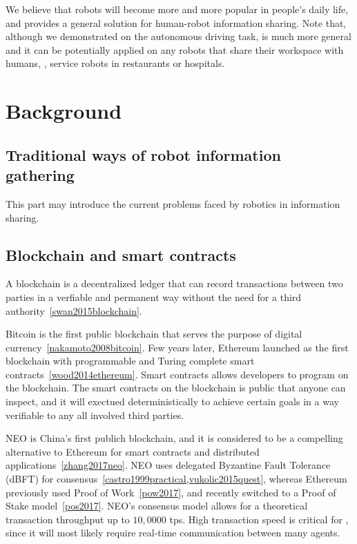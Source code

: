 \documentclass{article}
\begin{document}
We believe that robots will become more and more popular in
people's daily life, and \nrc provides a general solution
for human-robot information sharing.
Note that, although we demonstrated \nrc on the autonomous
driving task, \nrc is much more general and it can
be potentially applied on any robots that share their workspace
with humans, \eg, service robots in restaurants or hospitals.


\section{Background}
\label{sec:background}

\subsection{Traditional ways of robot information gathering}
\label{subsec:tranditional-ways}





This part may introduce the current problems faced by robotics in information sharing.

\subsection{Blockchain and smart contracts}
\label{subsec:blockchain}

A blockchain is a decentralized ledger that can record
transactions between two parties in a verfiable and permanent
way without the need for a third authority~\cref{swan2015blockchain}.

Bitcoin is the first public blockchain that serves the purpose
of digital currency~\cref{nakamoto2008bitcoin}.
Few years later, Ethereum launched as the first blockchain with
programmable and Turing complete smart contracts~\cref{wood2014ethereum}.
Smart contracts allows developers to program on the blockchain.
The smart contracts on the blockchain is public that anyone
can inspect, and it will exectued deterministically to achieve
certain goals in a way verifiable to any all involved third
parties.

NEO is China's first publich blockchain, and it is considered to
be a compelling alternative to Ethereum for smart contracts and
distributed applications~\cref{zhang2017neo}.
NEO uses delegated Byzantine Fault Tolerance (dBFT) for 
consensus~\cref{castro1999practical,vukolic2015quest}, 
whereas Ethereum previously used Proof
of Work~\cref{pow2017}, and recently switched to a Proof of Stake
model~\cref{pos2017}.
NEO’s consensus model allows for 
a theoretical transaction throughput up to $10,0000$ tps.
High transaction speed is critical for \nrc, 
since it will most likely require 
real-time communication between many agents.
\end{document}
